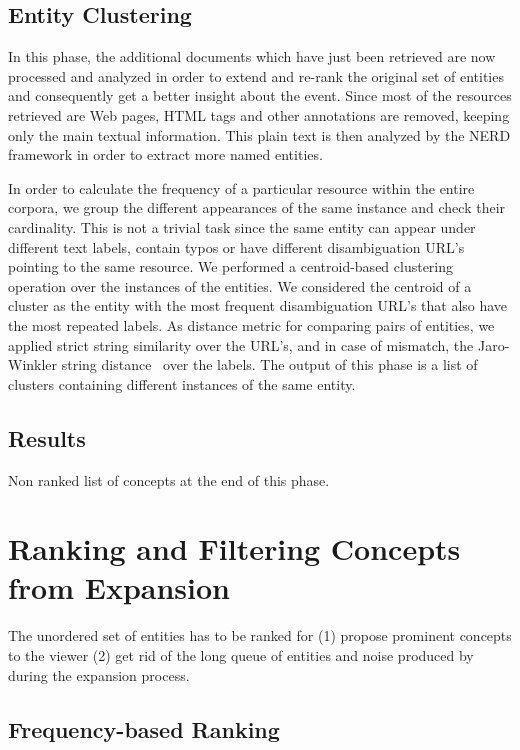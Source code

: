 \documentclass{llncs}
\begin{document}
\subsection{Entity Clustering}
In this phase, the additional documents which have just been retrieved are now processed and analyzed in order to extend and re-rank the original set of entities and consequently get a better insight about the event. Since most of the resources retrieved are Web pages, HTML tags and other annotations are removed, keeping only the main textual information. This plain text is then analyzed by the NERD framework in order to extract more named entities.

In order to calculate the frequency of a particular resource within the entire corpora, we group the different appearances of the same instance and check their cardinality. This is not a trivial task since the same entity can appear under different text labels, contain typos or have different disambiguation URL's pointing to the same resource. We performed a centroid-based clustering operation over the instances of the entities. We considered the centroid of a cluster as the entity with the most frequent disambiguation URL's that also have the most repeated labels. As distance metric for comparing pairs of entities, we applied strict string similarity over the URL's, and in case of mismatch, the Jaro-Winkler string distance~\cite{winkler2006overview} over the labels. The output of this phase is a list of clusters containing different instances of the same entity.

\subsection{Results}
Non ranked list of concepts at the end of this phase.

\section{Ranking and Filtering Concepts from Expansion}
\label{sec:Ranking}

The unordered set of entities has to be ranked for (1) propose prominent concepts to the viewer (2) get rid of the long queue of entities and noise produced by during the expansion process.

\subsection{Frequency-based Ranking}
\end{document}
